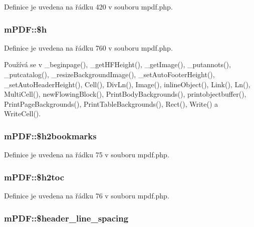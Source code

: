 Definice je uvedena na řádku 420 v souboru mpdf.\-php.

\hypertarget{classm_p_d_f_a6d9c7d34cc38ed78f7d469eae2ca77d7}{
\subsubsection[{\$h}]{\setlength{\rightskip}{0pt plus 5cm}m\-P\-D\-F\-::\$h}}\label{classm_p_d_f_a6d9c7d34cc38ed78f7d469eae2ca77d7}


Definice je uvedena na řádku 760 v souboru mpdf.\-php.



Používá se v \-\_\-beginpage(), \-\_\-get\-H\-F\-Height(), \-\_\-get\-Image(), \-\_\-putannots(), \-\_\-putcatalog(), \-\_\-resize\-Background\-Image(), \-\_\-set\-Auto\-Footer\-Height(), \-\_\-set\-Auto\-Header\-Height(), Cell(), Div\-Ln(), Image(), inline\-Object(), Link(), Ln(), Multi\-Cell(), new\-Flowing\-Block(), Print\-Body\-Backgrounds(), printobjectbuffer(), Print\-Page\-Backgrounds(), Print\-Table\-Backgrounds(), Rect(), Write() a Write\-Cell().

\hypertarget{classm_p_d_f_a3d6bc3f5c67c54437ffa55f414e091a3}{
\subsubsection[{\$h2bookmarks}]{\setlength{\rightskip}{0pt plus 5cm}m\-P\-D\-F\-::\$h2bookmarks}}\label{classm_p_d_f_a3d6bc3f5c67c54437ffa55f414e091a3}


Definice je uvedena na řádku 75 v souboru mpdf.\-php.

\hypertarget{classm_p_d_f_aa306a75eb91ab0aba8256c7d28a76313}{
\subsubsection[{\$h2toc}]{\setlength{\rightskip}{0pt plus 5cm}m\-P\-D\-F\-::\$h2toc}}\label{classm_p_d_f_aa306a75eb91ab0aba8256c7d28a76313}


Definice je uvedena na řádku 76 v souboru mpdf.\-php.

\hypertarget{classm_p_d_f_a4693ddf6c24da0122a7b065282360a7e}{
\subsubsection[{\$header\-\_\-line\-\_\-spacing}]{\setlength{\rightskip}{0pt plus 5cm}m\-P\-D\-F\-::\$header\-\_\-line\-\_\-spacing}}\label{classm_p_d_f_a4693ddf6c24da0122a7b065282360a7e}


